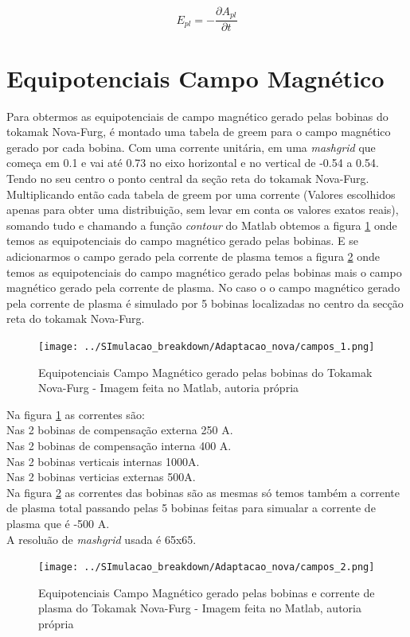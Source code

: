 \documentclass[12pt,oneside,a4paper]{abntex2}
\begin{document}
\begin{equation}
E_{pl}=-\frac{\partial A_{pl}}{\partial t}
\end{equation}

\section{Equipotenciais Campo Magnético}
Para obtermos as equipotenciais de campo magnético gerado pelas bobinas do tokamak Nova-Furg, é montado uma tabela de greem para o campo magnético gerado por cada bobina. Com uma corrente unitária, em uma \textit{mashgrid} que começa em 0.1 e vai até 0.73 no eixo horizontal e no vertical de -0.54 a 0.54. Tendo no seu centro o ponto central da seção reta do tokamak Nova-Furg.
Multiplicando então cada tabela de greem por uma corrente (Valores escolhidos apenas para obter uma distribuição, sem levar em conta os valores exatos reais), somando tudo e chamando a função \textit{contour} do Matlab obtemos a figura \ref{fig: equipotenc} onde temos as equipotenciais do campo magnético gerado pelas bobinas. E se adicionarmos o campo gerado pela corrente de plasma temos a figura \ref{fig: equipotenc2} onde temos as equipotenciais do campo magnético gerado pelas bobinas mais o campo magnético gerado pela corrente de plasma. No caso o o campo magnético gerado pela corrente de plasma é simulado por 5 bobinas localizadas no centro da secção reta do tokamak Nova-Furg.
\begin{figure}[H]
\centering
\caption{Equipotenciais Campo Magnético gerado pelas bobinas do Tokamak Nova-Furg - Imagem feita no Matlab, autoria própria}
\label{fig: equipotenc}
\texttt{[image: ../SImulacao\_breakdown/Adaptacao\_nova/campos\_1.png]} 
\end{figure}
Na figura \ref{fig: equipotenc} as correntes são: \\
Nas 2 bobinas de compensação externa 250 A.\\
Nas 2 bobinas de compensação interna 400 A.\\
Nas 2 bobinas verticais internas 1000A.\\ 
Nas 2 bobinas verticias externas 500A.\\
Na figura \ref{fig: equipotenc2} as correntes das bobinas são as mesmas só temos também a corrente de plasma total passando pelas 5 bobinas feitas para simualar a corrente de plasma que é -500 A.\\
A resoluão de \textit{mashgrid} usada é 65x65.
\begin{figure}[H]
\caption{Equipotenciais Campo Magnético  gerado pelas bobinas e corrente de plasma do Tokamak Nova-Furg - Imagem feita no Matlab, autoria própria}
\label{fig: equipotenc2}
\texttt{[image: ../SImulacao\_breakdown/Adaptacao\_nova/campos\_2.png]} 
\end{figure}
\end{document}
